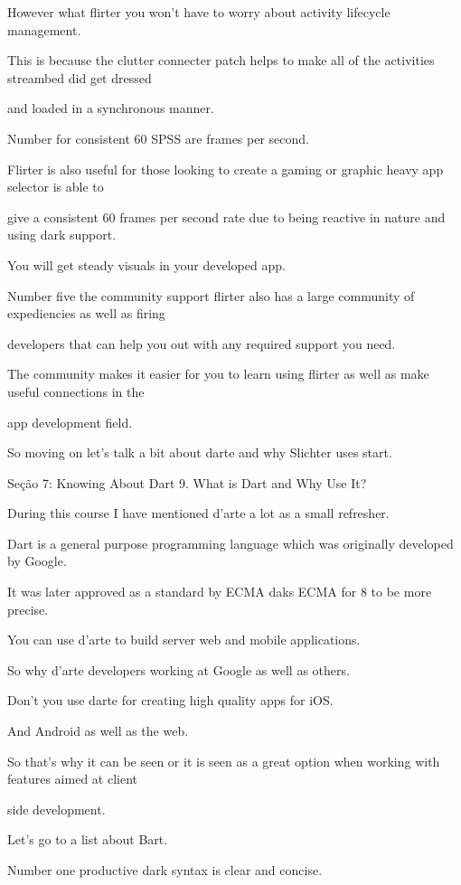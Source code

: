 However what flirter you won't have to worry about activity lifecycle management.

This is because the clutter connecter patch helps to make all of the activities streambed did get dressed

and loaded in a synchronous manner.

Number for consistent 60 SPSS are frames per second.

Flirter is also useful for those looking to create a gaming or graphic heavy app selector is able to

give a consistent 60 frames per second rate due to being reactive in nature and using dark support.

You will get steady visuals in your developed app.

Number five the community support flirter also has a large community of expediencies as well as firing

developers that can help you out with any required support you need.

The community makes it easier for you to learn using flirter as well as make useful connections in the

app development field.

So moving on let's talk a bit about darte and why Slichter uses start.

Seção 7: Knowing About Dart
9. What is Dart and Why Use It?

During this course I have mentioned d'arte a lot as a small refresher.

Dart is a general purpose programming language which was originally developed by Google.

It was later approved as a standard by ECMA daks ECMA for 8 to be more precise.

You can use d'arte to build server web and mobile applications.

So why d'arte developers working at Google as well as others.

Don't you use darte for creating high quality apps for iOS.

And Android as well as the web.

So that's why it can be seen or it is seen as a great option when working with features aimed at client

side development.

Let's go to a list about Bart.

Number one productive dark syntax is clear and concise.

